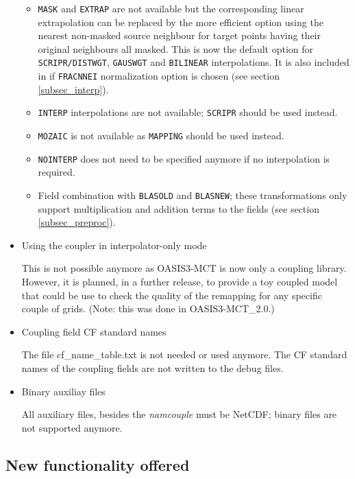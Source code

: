 \begin{itemize}
\begin{itemize}
\item {\tt MASK} and {\tt EXTRAP} are not available but the corresponding
linear extrapolation can be replaced by the more efficient option
using the nearest non-masked source neighbour for target points having
their original neighbours all masked. This is now the default option for {\tt SCRIPR/}{\tt DISTWGT}, {\tt GAUSWGT} and {\tt BILINEAR} interpolations. It is
also included in  if {\tt FRACNNEI}
normalization option is chosen (see section \ref{subsec_interp}).

\item {\tt INTERP} interpolations are not available; {\tt SCRIPR}
  should be used instead.

\item {\tt MOZAIC} is not available as {\tt MAPPING} should be used
  instead.

\item{\tt NOINTERP} does not need to be specified anymore if no
  interpolation is required.
 
\item Field combination with {\tt BLASOLD} and {\tt BLASNEW}; these
  transformations only support multiplication and addition terms to
the fields (see section \ref{subsec_preproc}). 

\end{itemize}

\item Using the coupler in interpolator-only mode

This is not possible anymore as OASIS3-MCT is now only a coupling
library. However, it is planned, in a further release, to provide a
toy coupled model that could be use to check the quality of the
remapping for any specific couple of grids. (Note: this was done in OASIS3-MCT\_2.0.)

\item Coupling field CF standard names

The file cf\_name\_table.txt is not needed or used anymore. The CF
  standard names of the coupling fields are not written to the debug
  files.

\item Binary auxiliay files

All auxiliary files, besides the {\it namcouple} must be NetCDF;
  binary files are not supported anymore.
\end{itemize}

\subsection{New functionality offered}
\label{sec_changes_new}

